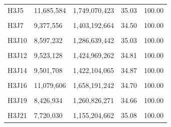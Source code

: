 \documentclass[
  a4paper,
  titlepage]{article}
\begin{document}
\begin{longtable}[t]{lllll}
H3J5 & 11,685,584 & 1,749,070,423 & 35.03 & 100.00\\
 
\cellcolor{gray!6}{H3J6} & \cellcolor{gray!6}{10,242,554} & \cellcolor{gray!6}{1,533,022,227} & \cellcolor{gray!6}{34.64} & \cellcolor{gray!6}{100.00}\\
 
H3J7 & 9,377,556 & 1,403,192,664 & 34.50 & 100.00\\
 
\cellcolor{gray!6}{H3J8} & \cellcolor{gray!6}{8,678,384} & \cellcolor{gray!6}{1,299,148,818} & \cellcolor{gray!6}{34.79} & \cellcolor{gray!6}{100.00}\\
 
H3J10 & 8,597,232 & 1,286,639,442 & 35.03 & 100.00\\
 
\cellcolor{gray!6}{H3J11} & \cellcolor{gray!6}{8,613,384} & \cellcolor{gray!6}{1,288,954,551} & \cellcolor{gray!6}{35.00} & \cellcolor{gray!6}{100.00}\\
 
H3J12 & 9,523,128 & 1,424,969,262 & 34.81 & 100.00\\
 
\cellcolor{gray!6}{H3J13} & \cellcolor{gray!6}{8,850,952} & \cellcolor{gray!6}{1,324,778,893} & \cellcolor{gray!6}{34.68} & \cellcolor{gray!6}{100.00}\\
 
H3J14 & 9,501,708 & 1,422,104,065 & 34.87 & 100.00\\
 
\cellcolor{gray!6}{H3J15} & \cellcolor{gray!6}{8,969,904} & \cellcolor{gray!6}{1,342,414,615} & \cellcolor{gray!6}{34.41} & \cellcolor{gray!6}{100.00}\\
 
H3J16 & 11,079,606 & 1,658,191,242 & 34.70 & 100.00\\
 
\cellcolor{gray!6}{H3J18} & \cellcolor{gray!6}{8,501,838} & \cellcolor{gray!6}{1,272,289,549} & \cellcolor{gray!6}{34.78} & \cellcolor{gray!6}{100.00}\\
 
H3J19 & 8,426,934 & 1,260,826,271 & 34.66 & 100.00\\
 
\cellcolor{gray!6}{H3J20} & \cellcolor{gray!6}{9,605,180} & \cellcolor{gray!6}{1,437,693,473} & \cellcolor{gray!6}{34.31} & \cellcolor{gray!6}{100.00}\\
 
H3J21 & 7,720,030 & 1,155,204,662 & 35.08 & 100.00\\
 

\end{longtable}
\end{document}

